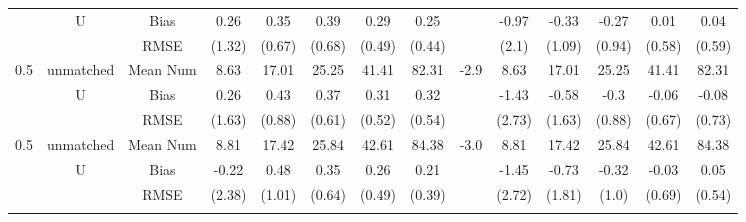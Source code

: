 \begin{tabular}{@{\extracolsep{5pt}}lc|cccccc|lccccc}
 & U & Bias & 0.26 & 0.35 & 0.39 & 0.29 & 0.25 &  & -0.97 & -0.33 & -0.27 & 0.01 & 0.04 \\
 &  & RMSE & (1.32) & (0.67) & (0.68) & (0.49) & (0.44) &  & (2.1) & (1.09) & (0.94) & (0.58) & (0.59) \\
0.5 & unmatched & Mean Num & 8.63 & 17.01 & 25.25 & 41.41 & 82.31 & -2.9 & 8.63 & 17.01 & 25.25 & 41.41 & 82.31 \\
 & U & Bias & 0.26 & 0.43 & 0.37 & 0.31 & 0.32 &  & -1.43 & -0.58 & -0.3 & -0.06 & -0.08 \\
 &  & RMSE & (1.63) & (0.88) & (0.61) & (0.52) & (0.54) &  & (2.73) & (1.63) & (0.88) & (0.67) & (0.73) \\
0.5 & unmatched & Mean Num & 8.81 & 17.42 & 25.84 & 42.61 & 84.38 & -3.0 & 8.81 & 17.42 & 25.84 & 42.61 & 84.38 \\
 & U & Bias & -0.22 & 0.48 & 0.35 & 0.26 & 0.21 &  & -1.45 & -0.73 & -0.32 & -0.03 & 0.05 \\
 &  & RMSE & (2.38) & (1.01) & (0.64) & (0.49) & (0.39) &  & (2.72) & (1.81) & (1.0) & (0.69) & (0.54) \\
 &  &  &  &  &  &  &  &  &  &  &  &  &  \\
\hline 
\bottomrule 
\end{tabular}
